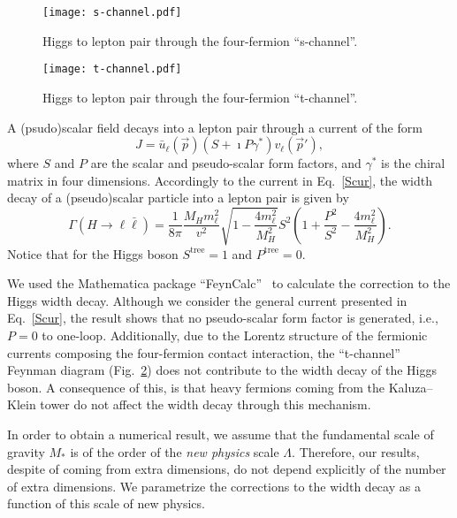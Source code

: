 \documentclass{ws-mpla}
\newcommand{\ga}{\gamma}
\renewcommand{\(}{\left(}
\renewcommand{\)}{\right)}
\renewcommand{\[}{\left[}
\renewcommand{\]}{\right]}
\begin{document}
\begin{figure}[hb]
  \begin{center}
    \texttt{[image: s-channel.pdf]}
  \end{center}
  \caption{Higgs to lepton pair through the four-fermion \mbox{``s-channel''.}}
  \label{fig:s}
\end{figure}

\begin{figure}[hbt]
  \begin{center}
    \texttt{[image: t-channel.pdf]}
  \end{center}
  \caption{Higgs to lepton pair through the four-fermion \mbox{``t-channel''.}}
  \label{fig:t}
\end{figure}

A (psudo)scalar field decays into a lepton pair through a current of the form
\begin{equation}
  J = \bar{u}_\ell(\vec{p}) \( S + \imath P \ga^* \) v_\ell(\vec{p}'),
  \label{Scur}
\end{equation}
where $S$ and $P$ are the scalar and pseudo-scalar form factors, and $\ga^*$ is the chiral matrix in four dimensions. Accordingly to the current in Eq.~\eqref{Scur}, the width decay of a (pseudo)scalar particle into a lepton pair is given by 
\begin{equation}
  \Gamma(H \to \ell \bar{\ell}) = \frac{1}{8 \pi} \frac{M_H m_\ell^2}{v^2}  \sqrt{1 - \frac{4 m_\ell^2}{M_H^2} }  S^2 \( 1 + \frac{P^2}{S^2} - \frac{4 m_\ell^2}{M_H^2} \).
\end{equation}
Notice that for the Higgs boson $S^{\text{tree}} = 1$ and $P^{\text{tree}} = 0$.

We used the Mathematica package ``FeynCalc''~\cite{Kublbeck:1992mt} to calculate the correction to the Higgs width decay. Although we consider the general current presented in Eq.~\eqref{Scur}, the result shows that no pseudo-scalar form factor is generated, i.e., $P = 0$ to one-loop. Additionally, due to the Lorentz structure of the fermionic currents composing the four-fermion contact interaction, the ``t-channel'' Feynman diagram (Fig.~\ref{fig:t}) does not contribute to the width decay of the Higgs boson. A consequence of this, is that heavy fermions coming from the Kaluza--Klein tower do not affect the width decay through this mechanism.

In order to obtain a numerical result, we assume that the fundamental scale of gravity $M_*$ is of the order of the \emph{new physics} scale $\Lambda$. Therefore, our results, despite of coming from extra dimensions, do not depend explicitly of the number of extra dimensions. We parametrize the corrections to the width decay as a function of this scale of new physics.
\end{document}
